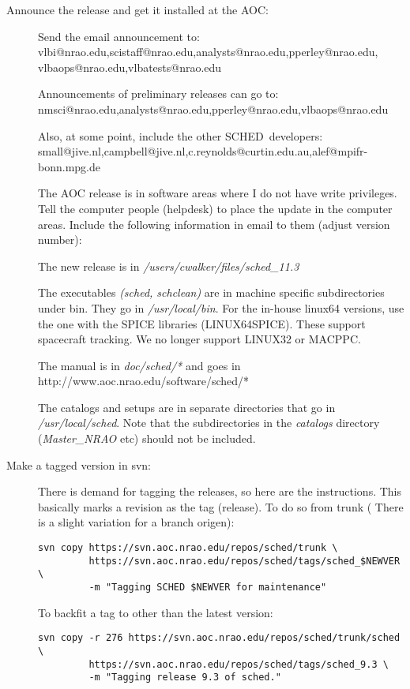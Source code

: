 \documentclass{report}
\newcommand{\schedb}{{\sc SCHED~}}
\begin{document}
\begin{description}
\item [Announce the release and get it installed at the AOC:]

Send the email announcement to:
vlbi@nrao.edu,scistaff@nrao.edu,analysts@nrao.edu,pperley@nrao.edu,
vlbaops@nrao.edu,vlbatests@nrao.edu

Announcements of preliminary releases can go to:
nmsci@nrao.edu,analysts@nrao.edu,pperley@nrao.edu,vlbaops@nrao.edu

Also, at some point, include the other \schedb developers:
small@jive.nl,campbell@jive.nl,c.reynolds@curtin.edu.au,alef@mpifr-bonn.mpg.de

The AOC release is in software areas where I do not have write
privileges.  Tell the computer people (helpdesk) to place the update
in the computer areas.  Include the following information in email to
them (adjust version number):

The new release is in {\sl /users/cwalker/files/sched\_11.3}

The executables {\sl (sched, schclean)} are in machine specific
subdirectories under bin.  They go in {\sl /usr/local/bin}.  For the
in-house linux64 versions, use the one with the SPICE libraries
(LINUX64SPICE). These support spacecraft tracking.  We no longer
support LINUX32 or MACPPC.

The manual is in {\sl doc/sched/*} and goes in
http://www.aoc.nrao.edu/software/sched/*

The catalogs and setups are in separate directories that go in {\sl
/usr/local/sched}.  Note that the subdirectories in the {\sl catalogs}
directory ({\sl Master\_NRAO} etc) should not be included.


\item [Make a tagged version in svn:]

There is demand for tagging the releases, so here are the instructions.
This basically marks a revision as the tag (release).
To do so from trunk ( There is a slight variation for a branch origen):

\begin{verbatim}
svn copy https://svn.aoc.nrao.edu/repos/sched/trunk \
         https://svn.aoc.nrao.edu/repos/sched/tags/sched_$NEWVER \
         -m "Tagging SCHED $NEWVER for maintenance"
\end{verbatim}

To backfit a tag to other than the latest version:

\begin{verbatim}
svn copy -r 276 https://svn.aoc.nrao.edu/repos/sched/trunk/sched \
         https://svn.aoc.nrao.edu/repos/sched/tags/sched_9.3 \
         -m "Tagging release 9.3 of sched."
\end{verbatim}



\end{description}
\end{document}
